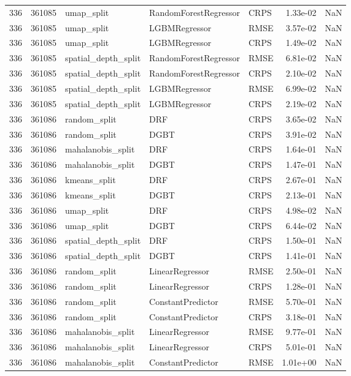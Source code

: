 \begin{tabular}{rrlllrr}
336 & 361085 & umap\_split & RandomForestRegressor & CRPS & 1.33e-02 & NaN \\
336 & 361085 & umap\_split & LGBMRegressor & RMSE & 3.57e-02 & NaN \\
336 & 361085 & umap\_split & LGBMRegressor & CRPS & 1.49e-02 & NaN \\
336 & 361085 & spatial\_depth\_split & RandomForestRegressor & RMSE & 6.81e-02 & NaN \\
336 & 361085 & spatial\_depth\_split & RandomForestRegressor & CRPS & 2.10e-02 & NaN \\
336 & 361085 & spatial\_depth\_split & LGBMRegressor & RMSE & 6.99e-02 & NaN \\
336 & 361085 & spatial\_depth\_split & LGBMRegressor & CRPS & 2.19e-02 & NaN \\
336 & 361086 & random\_split & DRF & CRPS & 3.65e-02 & NaN \\
336 & 361086 & random\_split & DGBT & CRPS & 3.91e-02 & NaN \\
336 & 361086 & mahalanobis\_split & DRF & CRPS & 1.64e-01 & NaN \\
336 & 361086 & mahalanobis\_split & DGBT & CRPS & 1.47e-01 & NaN \\
336 & 361086 & kmeans\_split & DRF & CRPS & 2.67e-01 & NaN \\
336 & 361086 & kmeans\_split & DGBT & CRPS & 2.13e-01 & NaN \\
336 & 361086 & umap\_split & DRF & CRPS & 4.98e-02 & NaN \\
336 & 361086 & umap\_split & DGBT & CRPS & 6.44e-02 & NaN \\
336 & 361086 & spatial\_depth\_split & DRF & CRPS & 1.50e-01 & NaN \\
336 & 361086 & spatial\_depth\_split & DGBT & CRPS & 1.41e-01 & NaN \\
336 & 361086 & random\_split & LinearRegressor & RMSE & 2.50e-01 & NaN \\
336 & 361086 & random\_split & LinearRegressor & CRPS & 1.28e-01 & NaN \\
336 & 361086 & random\_split & ConstantPredictor & RMSE & 5.70e-01 & NaN \\
336 & 361086 & random\_split & ConstantPredictor & CRPS & 3.18e-01 & NaN \\
336 & 361086 & mahalanobis\_split & LinearRegressor & RMSE & 9.77e-01 & NaN \\
336 & 361086 & mahalanobis\_split & LinearRegressor & CRPS & 5.01e-01 & NaN \\
336 & 361086 & mahalanobis\_split & ConstantPredictor & RMSE & 1.01e+00 & NaN \\

\end{tabular}
